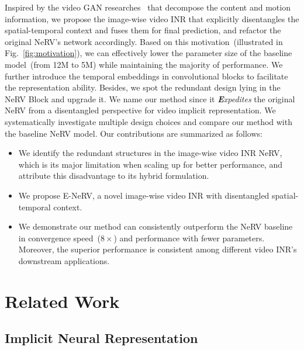 \documentclass[runningheads]{llncs}
\begin{document}
Inspired by the video GAN researches~\cite{villegas2017decomposing,hsieh2018learning,yu2021generating} that decompose the content and motion information, we propose the image-wise video INR that explicitly disentangles the spatial-temporal context and fuses them for final prediction, and refactor the original NeRV's network accordingly. Based on this motivation~(illustrated in Fig.~\ref{fig:motivation}), we can effectively lower the parameter size of the baseline model~(from 12M to 5M) while maintaining the majority of performance. We further introduce the temporal embeddings in convolutional blocks to facilitate the representation ability. Besides, we spot the redundant design lying in the NeRV Block and upgrade it. 
We name our method \netname since it \textit{\textbf{E}xpedites} the original NeRV from a disentangled perspective for video implicit representation. We systematically investigate multiple design choices and compare our method with the baseline NeRV model. Our contributions are summarized as follows:
\begin{itemize}
    \item We identify the redundant structures in the image-wise video INR NeRV, which is its major limitation when scaling up for better performance, and attribute this disadvantage to its hybrid formulation.
    \item We propose E-NeRV, a novel image-wise video INR with disentangled spatial-temporal context. 
    \item We demonstrate our method can consistently outperform the NeRV baseline in convergence speed~($8\times$) and performance with fewer parameters. Moreover, the superior performance is consistent among different video INR's downstream applications.
\end{itemize}
 \section{Related Work}
\label{related}

\subsection{Implicit Neural Representation}
\end{document}
